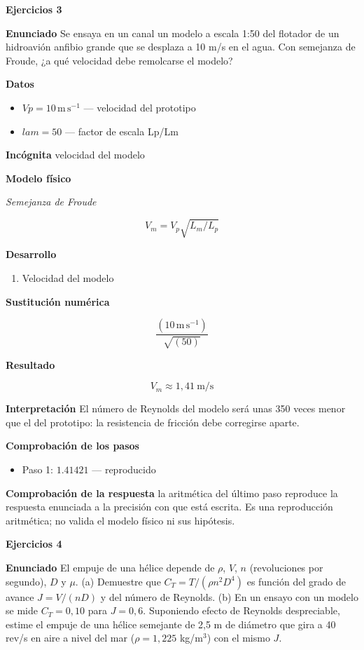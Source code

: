 \documentclass[10pt,openany]{book}
\begin{document}
\noindent\textbf{Ejercicios 3}

\noindent\textbf{Enunciado}
Se ensaya en un canal un modelo a escala 1:50 del flotador de un hidroavión anfibio grande que se desplaza a 10 m/s en el agua. Con semejanza de Froude, ¿a qué velocidad debe remolcarse el modelo?

\noindent\textbf{Datos}
\begin{itemize}
\item $Vp = 10\,\mathrm{m}\,\mathrm{s}^{-1}$ — velocidad del prototipo
\item $lam = 50$ — factor de escala Lp/Lm
\end{itemize}

\noindent\textbf{Incógnita}
velocidad del modelo

\noindent\textbf{Modelo físico}

\noindent\textit{Semejanza de Froude}

\[
V_m = V_p\sqrt{L_m/L_p}
\]

\noindent\textbf{Desarrollo}
\begin{enumerate}
\item
Velocidad del modelo
\end{enumerate}

\noindent\textbf{Sustitución numérica}

\[
\frac{\left(10\,\mathrm{m}\,\mathrm{s}^{-1}\right)}{\sqrt{\left(50\right)}}
\]

\noindent\textbf{Resultado}

\[
V_m \approx 1{,}41\ \mathrm{m/s}
\]

\noindent\textbf{Interpretación}
El número de Reynolds del modelo será unas 350 veces menor que el del prototipo: la resistencia de fricción debe corregirse aparte.

\noindent\textbf{Comprobación de los pasos}
\begin{itemize}
\item Paso 1: $1.41421$ — reproducido
\end{itemize}

\noindent\textbf{Comprobación de la respuesta} la aritmética del último paso reproduce la respuesta enunciada a la precisión con que está escrita. Es una reproducción aritmética; no valida el modelo físico ni sus hipótesis.

\noindent\textbf{Ejercicios 4}

\noindent\textbf{Enunciado}
El empuje de una hélice depende de \(\rho\), \(V\), \(n\) (revoluciones por segundo), \(D\) y \(\mu\). (a) Demuestre que \(C_T = T/(\rho n^{2}D^{4})\) es función del grado de avance \(J = V/(nD)\) y del número de Reynolds. (b) En un ensayo con un modelo se mide \(C_T = 0{,}10\) para \(J = 0{,}6\). Suponiendo efecto de Reynolds despreciable, estime el empuje de una hélice semejante de 2,5 m de diámetro que gira a 40 rev/s en aire a nivel del mar (\(\rho = 1{,}225\) kg/m\(^3\)) con el mismo \(J\).
\end{document}
